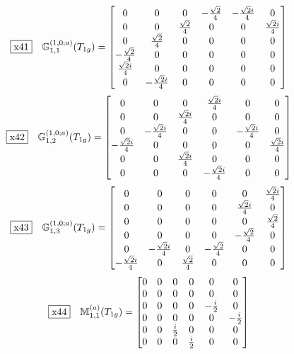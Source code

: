 \documentclass[fleqn,10pt,landscape]{jsarticle}
\begin{document}
\begin{dmath*}
\fbox{x41}\quad \mathbb{G}_{1,1}^{(1,0;a)}(T_{1g})=\begin{bmatrix} 0 & 0 & 0 & - \frac{\sqrt{2}}{4} & - \frac{\sqrt{2} i}{4} & 0 \\ 0 & 0 & \frac{\sqrt{2}}{4} & 0 & 0 & \frac{\sqrt{2} i}{4} \\ 0 & \frac{\sqrt{2}}{4} & 0 & 0 & 0 & 0 \\ - \frac{\sqrt{2}}{4} & 0 & 0 & 0 & 0 & 0 \\ \frac{\sqrt{2} i}{4} & 0 & 0 & 0 & 0 & 0 \\ 0 & - \frac{\sqrt{2} i}{4} & 0 & 0 & 0 & 0 \end{bmatrix}
\end{dmath*}
\begin{dmath*}
\fbox{x42}\quad \mathbb{G}_{1,2}^{(1,0;a)}(T_{1g})=\begin{bmatrix} 0 & 0 & 0 & \frac{\sqrt{2} i}{4} & 0 & 0 \\ 0 & 0 & \frac{\sqrt{2} i}{4} & 0 & 0 & 0 \\ 0 & - \frac{\sqrt{2} i}{4} & 0 & 0 & - \frac{\sqrt{2} i}{4} & 0 \\ - \frac{\sqrt{2} i}{4} & 0 & 0 & 0 & 0 & \frac{\sqrt{2} i}{4} \\ 0 & 0 & \frac{\sqrt{2} i}{4} & 0 & 0 & 0 \\ 0 & 0 & 0 & - \frac{\sqrt{2} i}{4} & 0 & 0 \end{bmatrix}
\end{dmath*}
\begin{dmath*}
\fbox{x43}\quad \mathbb{G}_{1,3}^{(1,0;a)}(T_{1g})=\begin{bmatrix} 0 & 0 & 0 & 0 & 0 & \frac{\sqrt{2} i}{4} \\ 0 & 0 & 0 & 0 & \frac{\sqrt{2} i}{4} & 0 \\ 0 & 0 & 0 & 0 & 0 & \frac{\sqrt{2}}{4} \\ 0 & 0 & 0 & 0 & - \frac{\sqrt{2}}{4} & 0 \\ 0 & - \frac{\sqrt{2} i}{4} & 0 & - \frac{\sqrt{2}}{4} & 0 & 0 \\ - \frac{\sqrt{2} i}{4} & 0 & \frac{\sqrt{2}}{4} & 0 & 0 & 0 \end{bmatrix}
\end{dmath*}
\begin{dmath*}
\fbox{x44}\quad \mathbb{M}_{1,1}^{(a)}(T_{1g})=\begin{bmatrix} 0 & 0 & 0 & 0 & 0 & 0 \\ 0 & 0 & 0 & 0 & 0 & 0 \\ 0 & 0 & 0 & 0 & - \frac{i}{2} & 0 \\ 0 & 0 & 0 & 0 & 0 & - \frac{i}{2} \\ 0 & 0 & \frac{i}{2} & 0 & 0 & 0 \\ 0 & 0 & 0 & \frac{i}{2} & 0 & 0 \end{bmatrix}
\end{dmath*}
\end{document}
